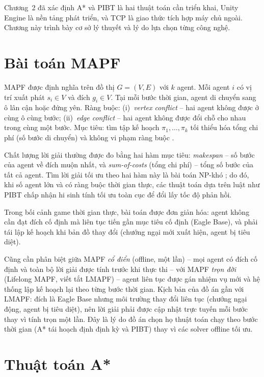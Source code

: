 \documentclass[../DoAn.tex]{subfiles}
\begin{document}
Chương~2 đã xác định A* và PIBT là hai thuật toán cần triển khai, Unity Engine là
nền tảng phát triển, và TCP là giao thức tích hợp máy chủ ngoài. Chương này trình bày
cơ sở lý thuyết và lý do lựa chọn từng công nghệ.

\section{Bài toán MAPF}
\label{section:3.1}

MAPF được định nghĩa trên đồ thị $G = (V, E)$ với $k$ agent. Mỗi agent $i$ có vị trí
xuất phát $s_i \in V$ và đích $g_i \in V$. Tại mỗi bước thời gian, agent di chuyển
sang ô lân cận hoặc đứng yên. Ràng buộc: (i)~\textit{vertex conflict} -- hai agent
không được ở cùng ô cùng bước; (ii)~\textit{edge conflict} -- hai agent không được
đổi chỗ cho nhau trong cùng một bước. Mục tiêu: tìm tập kế hoạch $\pi_1, \ldots, \pi_k$
tối thiểu hóa tổng chi phí (số bước di chuyển) và không vi phạm ràng buộc \cite{stern2019mapf}.

Chất lượng lời giải thường được đo bằng hai hàm mục tiêu: \emph{makespan} -- số bước của
agent về đích muộn nhất, và \emph{sum-of-costs} (tổng chi phí) -- tổng số bước của tất cả
agent. Tìm lời giải tối ưu theo hai hàm này là bài toán NP-khó \cite{stern2019mapf}; do đó,
khi số agent lớn và có ràng buộc thời gian thực, các thuật toán dựa trên luật như PIBT chấp
nhận hi sinh tính tối ưu toàn cục để đổi lấy tốc độ phản hồi.

Trong bối cảnh game thời gian thực, bài toán được đơn giản hóa: agent không cần đạt
đích cố định mà liên tục tiến gần mục tiêu cố định (Eagle Base), và phải tái lập kế
hoạch khi bản đồ thay đổi (chướng ngại mới xuất hiện, agent bị tiêu diệt).

Cũng cần phân biệt giữa MAPF \emph{cổ điển} (offline, một lần) -- mọi agent có đích cố định
và toàn bộ lời giải được tính trước khi thực thi -- với MAPF \emph{trọn đời} (Lifelong MAPF,
viết tắt LMAPF) -- agent liên tục được gán nhiệm vụ mới và hệ thống lập kế hoạch lại theo
từng bước thời gian. Kịch bản của đồ án gần với LMAPF: đích là Eagle Base nhưng môi trường
thay đổi liên tục (chướng ngại động, agent bị tiêu diệt), nên lời giải phải được cập nhật
trực tuyến mỗi bước thay vì tính trọn một lần. Đây là lý do đồ án chọn họ thuật toán chạy
theo bước thời gian (A* tái hoạch định định kỳ và PIBT) thay vì các solver offline tối ưu.

\section{Thuật toán A*}
\label{section:3.2}
\end{document}
